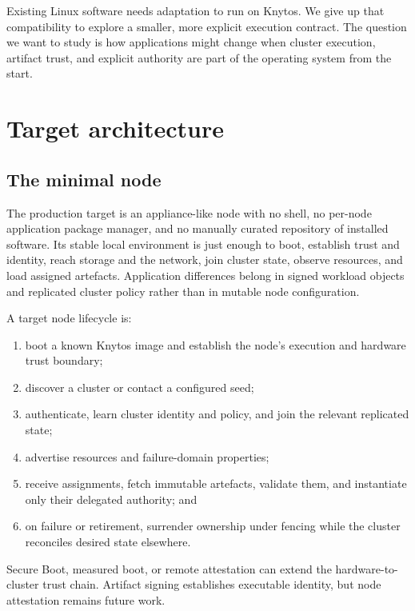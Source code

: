 Existing Linux software needs adaptation to run on Knytos. We give up
that compatibility to explore a smaller, more explicit execution contract.
The question we want to study is how applications might change when cluster
execution, artifact trust, and explicit authority are part of the operating
system from the start.

\section{Target architecture}

\subsection{The minimal node}

The production target is an appliance-like node with no shell, no per-node
application package manager, and no manually curated repository of installed
software. Its stable local environment is just enough to boot, establish
trust and identity, reach storage and the network, join cluster state,
observe resources, and load assigned artefacts. Application differences
belong in signed workload objects and replicated cluster policy rather than
in mutable node configuration.

A target node lifecycle is:

\begin{enumerate}
    \item boot a known Knytos image and establish the node's execution
        and hardware trust boundary;
    \item discover a cluster or contact a configured seed;
    \item authenticate, learn cluster identity and policy, and join the
        relevant replicated state;
    \item advertise resources and failure-domain properties;
    \item receive assignments, fetch immutable artefacts, validate them, and
        instantiate only their delegated authority; and
    \item on failure or retirement, surrender ownership under fencing while
        the cluster reconciles desired state elsewhere.
\end{enumerate}

Secure Boot, measured boot, or remote attestation can extend the
hardware-to-cluster trust chain. Artifact signing establishes executable
identity, but node attestation remains future work.

